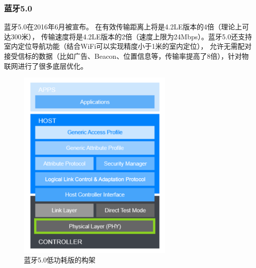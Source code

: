 \documentclass[11pt]{article}
\begin{document}
\subsubsection{蓝牙5.0}
蓝牙5.0在2016年6月被宣布。
在有效传输距离上将是4.2LE版本的4倍（理论上可达300米），
传输速度将是4.2LE版本的2倍（速度上限为24Mbps）。蓝牙5.0还支持室内定位导航功能（结合WiFi可以实现精度小于1米的室内定位），
允许无需配对接受信标的数据（比如广告、Beacon、位置信息等，传输率提高了8倍），针对物联网进行了很多底层优化。
\begin{figure}[H]
    \begin{center}
    \includegraphics[width=0.67\textwidth]{figures//bluetooth_le.png}
    \caption{蓝牙5.0低功耗版的构架}
    \end{center}
\end{figure}
\end{document}
